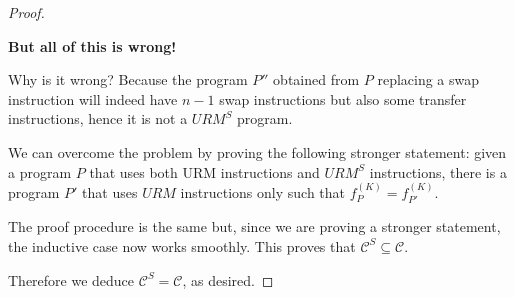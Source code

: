 \begin{exercise}
\begin{proof}
\begin{itemize}
\begin{enumerate}
  \textbf{But all of this is wrong!}
  
  Why is it wrong? Because the program $P''$ obtained from $P$ replacing a swap instruction will indeed have $n-1$ swap instructions but also some transfer instructions, hence it is not a $URM^S$ program.
  
  We can overcome the problem by proving the following stronger
  statement: given a program $P$ that uses both URM instructions and
  $URM^S$ instructions, there is a program $P'$ that uses $URM$
  instructions only such that $ f_{P}^{(K)} = f_{P'}^{(K)} $.
  
  The proof procedure is the same but, since we are proving a stronger
  statement, the inductive case now works smoothly. This proves that
  $ \mathcal{C}^S \subseteq \mathcal{C} $.
\end{enumerate}
\end{itemize}



Therefore we deduce $\mathcal{C}^S = \mathcal{C}$, as desired.
\end{proof}

\end{exercise}

